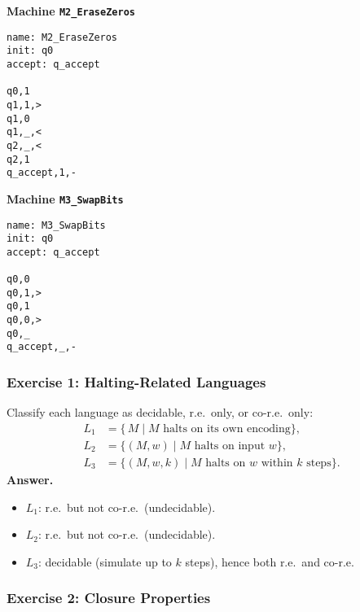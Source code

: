 \documentclass{article}
\theoremstyle{theorem}
\theoremstyle{definition}
\theoremstyle{remark}
\begin{document}
\newpage

\bigskip
\noindent\textbf{Machine \texttt{M2\_EraseZeros}}  
\begin{verbatim}
name: M2_EraseZeros
init: q0
accept: q_accept

q0,1
q1,1,>
q1,0
q1,_,<
q2,_,<
q2,1
q_accept,1,-
\end{verbatim}

\bigskip
\noindent\textbf{Machine \texttt{M3\_SwapBits}}  
\begin{verbatim}
name: M3_SwapBits
init: q0
accept: q_accept

q0,0
q0,1,>
q0,1
q0,0,>
q0,_
q_accept,_,-
\end{verbatim}

\bigskip
\subsubsection*{Exercise 1: Halting-Related Languages}

Classify each language as decidable, r.e.\ only, or co-r.e.\ only:
\[
\begin{aligned}
L_1 &= \{\,M \mid M\text{ halts on its own encoding}\},\\
L_2 &= \{(M,w)\mid M\text{ halts on input }w\},\\
L_3 &= \{(M,w,k)\mid M\text{ halts on }w\text{ within }k\text{ steps}\}.
\end{aligned}
\]
\textbf{Answer.}
\begin{itemize}
  \item \(L_1\): r.e.\ but not co-r.e.\ (undecidable).
  \item \(L_2\): r.e.\ but not co-r.e.\ (undecidable).
  \item \(L_3\): decidable (simulate up to \(k\) steps), hence both r.e.\ and co-r.e.
\end{itemize}

\subsubsection*{Exercise 2: Closure Properties}
\end{document}

